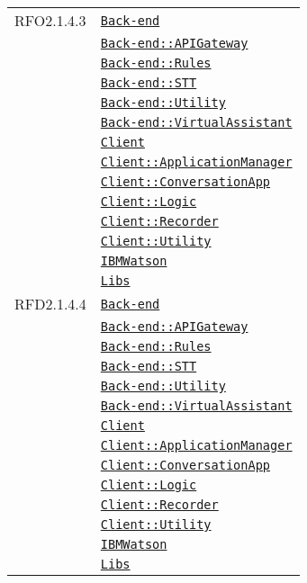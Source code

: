 \begin{longtable}{|>{\centering}m{3cm}|m{10cm}<{\centering}|}
RFO2.1.4.3 & \hyperref[Back-end]{\texttt{Back-end}}\\
& \hyperref[Back-end::APIGateway]{\texttt{Back-end::APIGateway}}\\
& \hyperref[Back-end::Rules]{\texttt{Back-end::Rules}}\\
& \hyperref[Back-end::STT]{\texttt{Back-end::STT}}\\
& \hyperref[Back-end::Utility]{\texttt{Back-end::Utility}}\\
& \hyperref[Back-end::VirtualAssistant]{\texttt{Back-end::VirtualAssistant}}\\
& \hyperref[Client]{\texttt{Client}}\\
& \hyperref[Client::ApplicationManager]{\texttt{Client::ApplicationManager}}\\
& \hyperref[Client::ConversationApp]{\texttt{Client::ConversationApp}}\\
& \hyperref[Client::Logic]{\texttt{Client::Logic}}\\
& \hyperref[Client::Recorder]{\texttt{Client::Recorder}}\\
& \hyperref[Client::Utility]{\texttt{Client::Utility}}\\
& \hyperref[IBMWatson]{\texttt{IBMWatson}}\\
& \hyperref[Libs]{\texttt{Libs}}\\ \hline

RFD2.1.4.4 & \hyperref[Back-end]{\texttt{Back-end}}\\
& \hyperref[Back-end::APIGateway]{\texttt{Back-end::APIGateway}}\\
& \hyperref[Back-end::Rules]{\texttt{Back-end::Rules}}\\
& \hyperref[Back-end::STT]{\texttt{Back-end::STT}}\\
& \hyperref[Back-end::Utility]{\texttt{Back-end::Utility}}\\
& \hyperref[Back-end::VirtualAssistant]{\texttt{Back-end::VirtualAssistant}}\\
& \hyperref[Client]{\texttt{Client}}\\
& \hyperref[Client::ApplicationManager]{\texttt{Client::ApplicationManager}}\\
& \hyperref[Client::ConversationApp]{\texttt{Client::ConversationApp}}\\
& \hyperref[Client::Logic]{\texttt{Client::Logic}}\\
& \hyperref[Client::Recorder]{\texttt{Client::Recorder}}\\
& \hyperref[Client::Utility]{\texttt{Client::Utility}}\\
& \hyperref[IBMWatson]{\texttt{IBMWatson}}\\
& \hyperref[Libs]{\texttt{Libs}}\\ \hline


\end{longtable}
